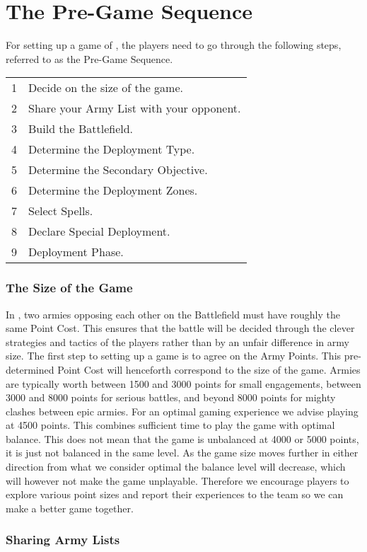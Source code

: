 
\part{The Pre-Game Sequence}
\label{the_pre_game_sequence}

For setting up a game of \nameofthegame{}, the players need to go through the following steps, referred to as the Pre-Game Sequence.

\hspace*{0.3cm}
\begin{tabular}{c|l}
1 & Decide on the size of the game. \tabularnewline
2 & Share your Army List with your opponent. \tabularnewline
3 & Build the Battlefield. \tabularnewline
4 & Determine the Deployment Type. \tabularnewline
5 & Determine the Secondary Objective. \tabularnewline
6 & Determine the Deployment Zones. \tabularnewline
7 & Select Spells. \tabularnewline
8 & Declare Special Deployment. \tabularnewline
9 & Deployment Phase. \tabularnewline
\end{tabular}

\section{The Size of the Game}
\label{the_size_of_the_game}

In \nameofthegame{}, two armies opposing each other on the Battlefield must have roughly the same Point Cost. This ensures that the battle will be decided through the clever strategies and tactics of the players rather than by an unfair difference in army size. The first step to setting up a game is to agree on the Army Points. This pre-determined Point Cost will henceforth correspond to the size of the game. Armies are typically worth between 1500 and 3000 points for small engagements, between 3000 and 8000 points for serious battles, and beyond 8000 points for mighty clashes between epic armies. For an optimal gaming experience we advise playing at 4500 points. This combines sufficient time to play the game with optimal balance. This does not mean that the game is unbalanced at 4000 or 5000 points, it is just not balanced in the same level. As the game size moves further in either direction from what we consider optimal the balance level will decrease, which will however not make the game unplayable. Therefore we encourage players to explore various point sizes and report their experiences to the \theninthage{} team so we can make a better game together.

\section{Sharing Army Lists}
\label{sharing_army_lists}

